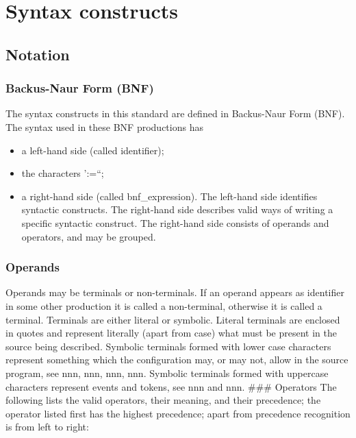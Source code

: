 \hypertarget{syntax-constructs}{%
\chapter{Syntax constructs}\label{syntax-constructs}}

\hypertarget{notation}{%
\section{Notation}\label{notation}}

\hypertarget{backus-naur-form-bnf}{%
\subsection{Backus-Naur Form (BNF)}\label{backus-naur-form-bnf}}

The syntax constructs in this standard are defined in Backus-Naur Form
(BNF). The syntax used in these BNF productions has

\begin{itemize}
\item
  a left-hand side (called identifier);
\item
  the characters ':=``;
\item
  a right-hand side (called bnf\_expression). The left-hand side
  identifies syntactic constructs. The right-hand side describes valid
  ways of writing a specific syntactic construct. The right-hand side
  consists of operands and operators, and may be grouped.
\end{itemize}

\hypertarget{operands}{%
\subsection{Operands}\label{operands}}

Operands may be terminals or non-terminals. If an operand appears as
identifier in some other production it is called a non-terminal,
otherwise it is called a terminal. Terminals are either literal or
symbolic. Literal terminals are enclosed in quotes and represent
literally (apart from case) what must be present in the source being
described. Symbolic terminals formed with lower case characters
represent something which the configuration may, or may not, allow in
the source program, see nnn, nnn, nnn, nnn. Symbolic terminals formed
with uppercase characters represent events and tokens, see nnn and nnn.
\#\#\# Operators The following lists the valid operators, their meaning,
and their precedence; the operator listed first has the highest
precedence; apart from precedence recognition is from left to right:

